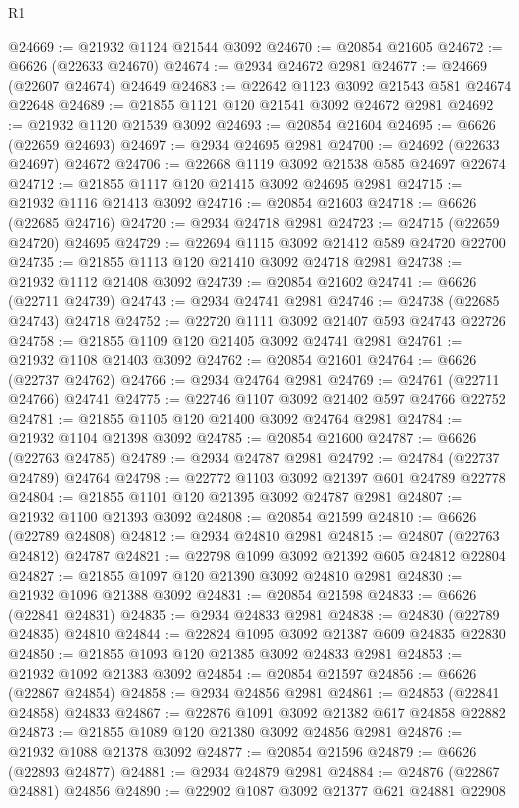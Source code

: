 \begin{lexlean}{R1}
\begin{coremodule}
@24669 := @21932 @1124 @21544 @3092
@24670 := @20854 @21605
@24672 := @6626 (@22633 @24670)
@24674 := @2934 @24672 @2981
@24677 := @24669 (@22607 @24674) @24649
@24683 := @22642 @1123 @3092 @21543 @581 @24674 @22648
@24689 := @21855 @1121 @120 @21541 @3092 @24672 @2981
@24692 := @21932 @1120 @21539 @3092
@24693 := @20854 @21604
@24695 := @6626 (@22659 @24693)
@24697 := @2934 @24695 @2981
@24700 := @24692 (@22633 @24697) @24672
@24706 := @22668 @1119 @3092 @21538 @585 @24697 @22674
@24712 := @21855 @1117 @120 @21415 @3092 @24695 @2981
@24715 := @21932 @1116 @21413 @3092
@24716 := @20854 @21603
@24718 := @6626 (@22685 @24716)
@24720 := @2934 @24718 @2981
@24723 := @24715 (@22659 @24720) @24695
@24729 := @22694 @1115 @3092 @21412 @589 @24720 @22700
@24735 := @21855 @1113 @120 @21410 @3092 @24718 @2981
@24738 := @21932 @1112 @21408 @3092
@24739 := @20854 @21602
@24741 := @6626 (@22711 @24739)
@24743 := @2934 @24741 @2981
@24746 := @24738 (@22685 @24743) @24718
@24752 := @22720 @1111 @3092 @21407 @593 @24743 @22726
@24758 := @21855 @1109 @120 @21405 @3092 @24741 @2981
@24761 := @21932 @1108 @21403 @3092
@24762 := @20854 @21601
@24764 := @6626 (@22737 @24762)
@24766 := @2934 @24764 @2981
@24769 := @24761 (@22711 @24766) @24741
@24775 := @22746 @1107 @3092 @21402 @597 @24766 @22752
@24781 := @21855 @1105 @120 @21400 @3092 @24764 @2981
@24784 := @21932 @1104 @21398 @3092
@24785 := @20854 @21600
@24787 := @6626 (@22763 @24785)
@24789 := @2934 @24787 @2981
@24792 := @24784 (@22737 @24789) @24764
@24798 := @22772 @1103 @3092 @21397 @601 @24789 @22778
@24804 := @21855 @1101 @120 @21395 @3092 @24787 @2981
@24807 := @21932 @1100 @21393 @3092
@24808 := @20854 @21599
@24810 := @6626 (@22789 @24808)
@24812 := @2934 @24810 @2981
@24815 := @24807 (@22763 @24812) @24787
@24821 := @22798 @1099 @3092 @21392 @605 @24812 @22804
@24827 := @21855 @1097 @120 @21390 @3092 @24810 @2981
@24830 := @21932 @1096 @21388 @3092
@24831 := @20854 @21598
@24833 := @6626 (@22841 @24831)
@24835 := @2934 @24833 @2981
@24838 := @24830 (@22789 @24835) @24810
@24844 := @22824 @1095 @3092 @21387 @609 @24835 @22830
@24850 := @21855 @1093 @120 @21385 @3092 @24833 @2981
@24853 := @21932 @1092 @21383 @3092
@24854 := @20854 @21597
@24856 := @6626 (@22867 @24854)
@24858 := @2934 @24856 @2981
@24861 := @24853 (@22841 @24858) @24833
@24867 := @22876 @1091 @3092 @21382 @617 @24858 @22882
@24873 := @21855 @1089 @120 @21380 @3092 @24856 @2981
@24876 := @21932 @1088 @21378 @3092
@24877 := @20854 @21596
@24879 := @6626 (@22893 @24877)
@24881 := @2934 @24879 @2981
@24884 := @24876 (@22867 @24881) @24856
@24890 := @22902 @1087 @3092 @21377 @621 @24881 @22908

\end{coremodule}
\end{lexlean}

